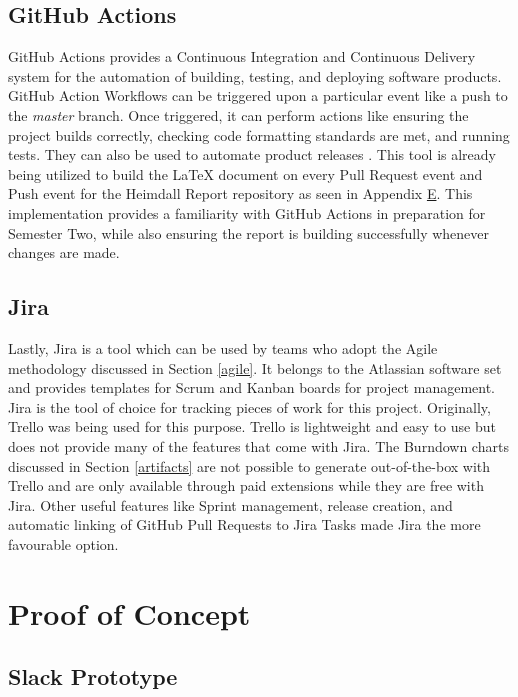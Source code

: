 \documentclass{article}
\begin{document}
\subsection{GitHub Actions} \label{gha}

GitHub Actions provides a Continuous Integration and Continuous Delivery system for the automation of building, testing, and deploying software products. GitHub Action Workflows can be triggered upon a particular event like a push to the \emph{master} branch. Once triggered, it can perform actions like ensuring the project builds correctly, checking code formatting standards are met, and running tests. They can also be used to automate product releases \cite{github-actions}. This tool is already being utilized to build the LaTeX document on every Pull Request event and Push event for the Heimdall Report repository as seen in Appendix \hyperlink{appendix-e}{E}. This implementation provides a familiarity with GitHub Actions in preparation for Semester Two, while also ensuring the report is building successfully whenever changes are made.



\subsection{Jira}

Lastly, Jira is a tool which can be used by teams who adopt the Agile methodology discussed in Section \ref{agile}. It belongs to the Atlassian software set and provides templates for Scrum and Kanban boards for project management. Jira is the tool of choice for tracking pieces of work for this project. Originally, Trello was being used for this purpose. Trello is lightweight and easy to use but does not provide many of the features that come with Jira. The Burndown charts discussed in Section \ref{artifacts} are not possible to generate out-of-the-box with Trello and are only available through paid extensions while they are free with Jira. Other useful features like Sprint management, release creation, and automatic linking of GitHub Pull Requests to Jira Tasks made Jira the more favourable option.

\section{Proof of Concept}

\subsection{Slack Prototype}
\end{document}
